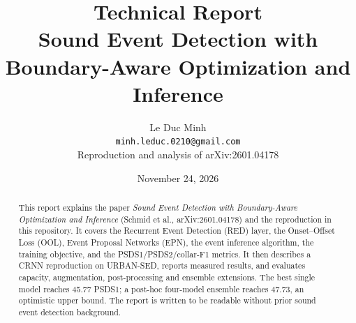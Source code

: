 \documentclass[10pt,a4paper]{article}
\title{\textbf{Technical Report}\\[4pt]
Sound Event Detection with\\Boundary-Aware Optimization and Inference}
\author{Le Duc Minh\\
\texttt{minh.leduc.0210@gmail.com}\\
Reproduction and analysis of arXiv:2601.04178}
\date{November 24, 2026}
\begin{document}
\maketitle

\begin{abstract}
This report explains the paper \emph{Sound Event Detection with Boundary-Aware
Optimization and Inference} \cite{paper} (Schmid et al., arXiv:2601.04178) and the
reproduction in this repository. It covers the Recurrent Event Detection (RED)
layer, the Onset--Offset Loss (OOL), Event Proposal Networks (EPN), the event
inference algorithm, the training objective, and the PSDS1/PSDS2/collar-F1
metrics. It then describes a CRNN reproduction on URBAN-SED, reports measured
results, and evaluates capacity, augmentation, post-processing and ensemble
extensions. The best single model reaches 45.77 PSDS1; a post-hoc four-model
ensemble reaches 47.73, an optimistic upper bound. The report is written
to be readable without prior sound event detection background.
\end{abstract}

\tableofcontents
















\end{document}
